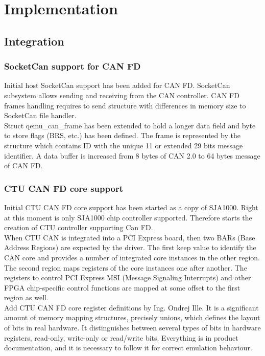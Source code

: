 \documentclass{ctuthesis}
\begin{document}
\chapter{Implementation}
 
\section{Integration}

 \subsection{SocketCan support for CAN FD}
  Initial host SocketCan support has been added for CAN FD. SocketCan subsystem allows sending and receiving from the CAN controller. CAN FD frames handling requires to send structure with differences in memory size to SocketCan file handler. \\
  Struct qemu\_can\_frame has been extended to hold a longer data field and byte to store flags (BRS, etc.) has been defined. The frame is represented by the structure which contains ID with the unique 11 or extended 29 bits message identifier. A data buffer is increased from 8 bytes of CAN 2.0 to 64 bytes message of CAN FD.

 \subsection{CTU CAN FD core support}
  Initial CTU CAN FD core support has been started as a copy of SJA1000. Right at this moment is only SJA1000 chip controller supported. Therefore starts the creation of CTU controller supporting Can FD. \\
  When CTU CAN is integrated into a PCI Express board, then two BARs (Base Address Regions) are expected by the driver. The first keep value to identify the CAN core and provides a number of integrated core instances in the other region. The second region maps registers of the core instances one after another. The registers to control PCI Express MSI (Message Signaling Interrupts) and other FPGA chip-specific control functions are mapped at some offset to the first region as well. \\ 
  Add CTU CAN FD core register definitions by Ing. Ondrej Ille. It is a significant amount of memory mapping structures, precisely unions, which defines the layout of bits in real hardware. It distinguishes between several types of bits in hardware registers, read-only, write-only or read/write bits. Everything is in product documentation, and it is necessary to follow it for correct emulation behaviour.
 
\end{document}
